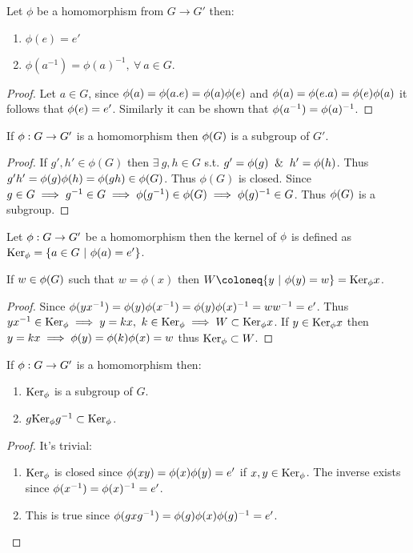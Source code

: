 \begin{lemma}
  Let $\phi$ be a homomorphism from $G\to G'$ then:
  \begin{enumerate}
    \item $\phi(e) = e'$
    \item $\phi(a^{-1}) = \phi(a)^{-1},\ \forall\ a\in G$.
  \end{enumerate}
\end{lemma}
\begin{proof}
  Let $a\in G$, since $\phi(a) = \phi(a.e) = \phi(a)\phi(e)$ and $\phi(a) = \phi(e.a) = \phi(e)\phi(a)$ it follows that $\phi(e) = e'$. Similarly it can be shown that $\phi(a^{-1}) = \phi(a)^{-1}$.
\end{proof}
\begin{lemma}
  If $\phi:G\to G'$ is a homomorphism then $\phi(G)$ is a subgroup of $G'$.
\end{lemma}
\begin{proof}
  If $g', h' \in \phi(G)$ then $\exists\ g,h\in G$ s.t. $g' = \p(g) \And h'=\p(h)$. Thus $g'h' = \phi(g)\phi(h) = \phi(gh) \in \phi(G)$. Thus $\phi(G)$ is closed. Since $g\in G\implies g^{-1} \in G \implies \phi(g^{-1}) \in \phi(G) \implies \phi(g)^{-1}\in G$. Thus $\phi(G)$ is a subgroup.
\end{proof}
\begin{definition}
  Let $\phi:G\to G'$ be a homomorphism then the kernel of $\phi$ is defined as $\text{Ker}_\phi = \{a\in G\ |\ \phi(a) = e'\}$.
\end{definition}
\begin{lemma}\label{lem:W}
  If $w\in \phi(G)$ such that $w = \phi(x)$ then $W \coloneq \{y\ |\ \p(y) = w\} = \Ker_\p x$. 
\end{lemma}
\begin{proof}
  Since $\phi(yx^{-1}) = \phi(y)\phi(x^{-1}) = \phi(y)\phi(x)^{-1} = ww^{-1} = e'$. Thus $yx^{-1}\in \text{Ker}_\phi \implies y = kx,\ k\in \text{Ker}_\phi \implies W\subset \text{Ker}_\phi x$. If $y\in \text{Ker}_\phi x$ then $y =kx \implies \phi(y)= \phi(k)\phi(x) = w$ thus $\text{Ker}_\phi \subset W$.
\end{proof}
\begin{theorem}
  If $\phi:G\to G'$ is a homomorphism then:
  \begin{enumerate}
    \item $\text{Ker}_\phi$ is a subgroup of $G$.
    \item $g \text{Ker}_\phi g^{-1} \subset \text{Ker}_\phi$.
  \end{enumerate}
\end{theorem}
\begin{proof}
  It's trivial:
  \begin{enumerate}
    \item $\text{Ker}_\phi$ is closed since $\phi(xy) = \phi(x)\phi(y) = e'$ if $x,y \in \text{Ker}_\phi$. The inverse exists since $\phi(x^{-1}) = \phi(x)^{-1} = e'$.
    \item This is true since $\phi(gxg^{-1}) = \phi(g)\phi(x)\phi(g)^{-1} = e'$.
  \end{enumerate}
\end{proof}
